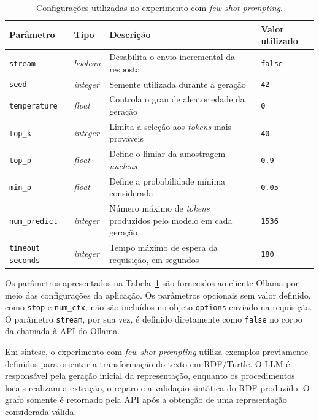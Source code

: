 \begin{table}[htbp]
\centering
\caption{Configurações utilizadas no experimento com \textit{few-shot prompting}.}
\label{tab:llm-config-a}
\small
\renewcommand{\arraystretch}{1.3}

\begin{tabular}{
p{3.5cm}
p{1.8cm}
p{6.5cm}
p{2.5cm}
}
\toprule
\textbf{Parâmetro} &
\textbf{Tipo} &
\textbf{Descrição} &
\textbf{Valor utilizado} \\
\midrule

\texttt{stream}
&
\textit{boolean}
&
Desabilita o envio incremental da resposta
&
\texttt{false}
\\

\texttt{seed}
&
\textit{integer}
&
Semente utilizada durante a geração
&
\texttt{42}
\\

\texttt{temperature}
&
\textit{float}
&
Controla o grau de aleatoriedade da geração
&
\texttt{0}
\\

\texttt{top\_k}
&
\textit{integer}
&
Limita a seleção aos \textit{tokens} mais prováveis
&
\texttt{40}
\\

\texttt{top\_p}
&
\textit{float}
&
Define o limiar da amostragem \textit{nucleus}
&
\texttt{0.9}
\\

\texttt{min\_p}
&
\textit{float}
&
Define a probabilidade mínima considerada
&
\texttt{0.05}
\\

\texttt{num\_predict}
&
\textit{integer}
&
Número máximo de \textit{tokens} produzidos pelo modelo em cada geração
&
\texttt{1536}
\\

\texttt{timeout seconds}
&
\textit{integer}
&
Tempo máximo de espera da requisição, em segundos
&
\texttt{180}
\\

\bottomrule
\end{tabular}
\end{table}

Os parâmetros apresentados na Tabela~\ref{tab:llm-config-a} são fornecidos ao cliente Ollama por meio das configurações da aplicação. Os parâmetros opcionais sem valor definido, como \texttt{stop} e \texttt{num\_ctx}, não são incluídos no objeto \texttt{options} enviado na requisição. O parâmetro \texttt{stream}, por sua vez, é definido diretamente como \texttt{false} no corpo da chamada à API do Ollama.

Em síntese, o experimento com \textit{few-shot prompting} utiliza exemplos previamente definidos para orientar a transformação do texto em RDF/Turtle. O LLM é responsável pela geração inicial da representação, enquanto os procedimentos locais realizam a extração, o reparo e a validação sintática do RDF produzido. O grafo somente é retornado pela API após a obtenção de uma representação considerada válida.

